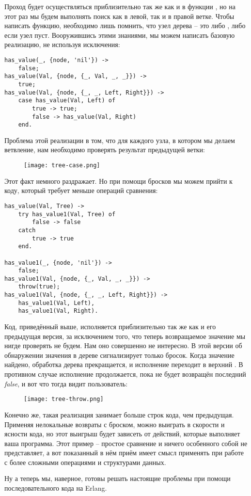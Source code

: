Проход будет осуществляться приблизительно так же как и в функции , но на этот раз мы будем выполнять поиск как в левой, так и в правой ветке.
Чтобы написать функцию, необходимо лишь помнить, что узел дерева \--- это либо , либо  если узел пуст.
Вооружившись этими знаниями, мы можем написать базовую реализацию, не используя исключения:
\begin{lstlisting}[style=erlang]
%% looks for a given value 'Val' in the tree.
has_value(_, {node, 'nil'}) ->
    false;
has_value(Val, {node, {_, Val, _, _}}) ->
    true;
has_value(Val, {node, {_, _, Left, Right}}) ->
    case has_value(Val, Left) of
        true -> true;
        false -> has_value(Val, Right)
    end.
\end{lstlisting}

Проблема этой реализации в том, что для каждого узла, в котором мы делаем ветвление, нам необходимо проверять результат предыдущей ветки:
\blankline
\blankline
\begin{figure}[h!]
    \centering
    \texttt{[image: tree-case.png]}
\end{figure}

Этот факт немного раздражает.
Но при помощи бросков мы можем прийти к коду, который требует меньше операций сравнения:
\begin{lstlisting}[style=erlang]
has_value(Val, Tree) ->
    try has_value1(Val, Tree) of
        false -> false
    catch
        true -> true
    end.
 
has_value1(_, {node, 'nil'}) ->
    false;
has_value1(Val, {node, {_, Val, _, _}}) ->
    throw(true);
has_value1(Val, {node, {_, _, Left, Right}}) ->
    has_value1(Val, Left),
    has_value1(Val, Right).
\end{lstlisting}

Код, приведённый выше, исполняется приблизительно так же как и его предыдущая версия, за исключением того, что теперь возвращаемое значение мы нигде проверять не будем.
Нам оно совершенно не интересно.
В этой версии об обнаружении значения в дереве сигнализирует только бросок.
Когда значение найдено, обработка дерева прекращается, и исполнение переходит в верхний .
В противном случае исполнение продолжается, пока не будет возвращён последний \emph{false}, и вот что тогда видит пользователь:
\begin{figure}[h!]
    \centering
    \texttt{[image: tree-throw.png]}
\end{figure}

Конечно же, такая реализация занимает больше строк кода, чем предыдущая.
Применяя нелокальные возвраты с броском, можно выиграть в скорости и ясности кода, но этот выигрыш будет зависеть от действий, которые выполняет ваша программа.
Этот пример \--- простое сравнение и ничего особенного собой не представляет, а вот показанный в нём приём имеет смысл применять при работе с более сложными операциями и структурами данных.

Ну а теперь мы, наверное, готовы решать настоящие проблемы при помощи последовательного кода на Erlang.
